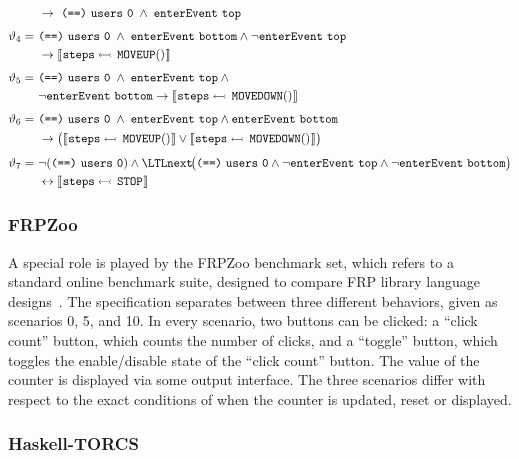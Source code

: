\begin{align*}
                   & \rightarrow \ \name{(==)}~\name{users}~\name{0} \; \wedge \; \name{enterEvent}~\name{top} \\[0.4em]
  \vartheta_{4} =\ & \name{(==)}~\name{users}~\name{0} \; \wedge \; \name{enterEvent}~\name{bottom} \wedge \neg \name{enterEvent}~\name{top} \\
                   & \rightarrow \upd{\name{steps}}{\name{MOVEUP}()}  \\[0.4em]
  \vartheta_{5} =\ & \name{(==)}~\name{users}~\name{0} \; \wedge \; \name{enterEvent}~\name{top} \wedge \mbox{\ } \\
                   & \neg \name{enterEvent}~\name{bottom} \rightarrow \upd{\name{steps}}{\name{MOVEDOWN}()}  \\[0.4em]
  \vartheta_{6} =\ & \name{(==)}~\name{users}~\name{0} \; \wedge \; \name{enterEvent}~\name{top} \wedge \name{enterEvent}~\name{bottom} \\
                   & \rightarrow \big(\upd{\name{steps}}{\name{MOVEUP}()} \vee \upd{\name{steps}}{\name{MOVEDOWN}()} \big)  \\[0.4em]
  \vartheta_{7} =\ & \neg (\name{(==)}~\name{users}~\name{0}) \wedge \LTLnext \! \big(\name{(==)}~\name{users}~\name{0} \wedge
                     \neg \name{enterEvent}~\name{top} \wedge \neg \name{enterEvent}~\name{bottom}\big) \\
                   & \leftrightarrow \upd{\name{steps}}{\name{STOP}} \\
\end{align*}

\subsubsection{FRPZoo}

A special role is played by the
FRPZoo benchmark set, which refers to a standard online benchmark
suite, designed to compare FRP library language designs~\cite{FRPzoo}.
The specification separates between three different behaviors, given
as scenarios 0, 5, and 10. In every scenario, two buttons can be
clicked: a ``click count'' button, which counts the number of clicks,
and a ``toggle'' button, which toggles the enable/disable state of the ``click
count'' button. The value of the counter is displayed via some
output interface. The three scenarios differ with respect to the exact
conditions of when the counter is updated, reset or displayed.

\subsubsection{Haskell-TORCS}


